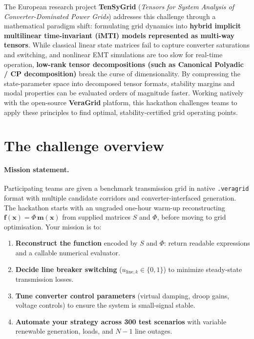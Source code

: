 \documentclass[11pt,a4paper]{article}
\begin{document}
The European research project \textbf{TenSyGrid} (\textit{Tensors for System Analysis of Converter-Dominated Power Grids}) addresses this challenge through a mathematical paradigm shift: formulating grid dynamics into \textbf{hybrid implicit multilinear time-invariant (iMTI) models represented as multi-way tensors}. While classical linear state matrices fail to capture converter saturations and switching, and nonlinear EMT simulations are too slow for real-time operation, \textbf{low-rank tensor decompositions (such as Canonical Polyadic / CP decomposition)} break the curse of dimensionality. By compressing the state-parameter space into decomposed tensor formats, stability margins and modal properties can be evaluated orders of magnitude faster. Working natively with the open-source \textbf{VeraGrid} platform, this hackathon challenges teams to apply these principles to find optimal, stability-certified grid operating points.

\section{The challenge overview}

\paragraph{Mission statement.}
Participating teams are given a benchmark transmission grid in native \texttt{.veragrid} format with multiple candidate corridors and converter-interfaced generation. The hackathon starts with an ungraded one-hour warm-up reconstructing $\mathbf f(\mathbf x)=\Phi\,\mathbf m(\mathbf x)$ from supplied matrices $S$ and $\Phi$, before moving to grid optimisation. Your mission is to:
\begin{enumerate}[leftmargin=*, itemsep=2pt]
  \item \textbf{Reconstruct the function} encoded by $S$ and $\Phi$: return readable expressions and a callable numerical evaluator.
  \item \textbf{Decide line breaker switching} ($u_{\text{line}, k} \in \{0, 1\}$) to minimize steady-state transmission losses.
  \item \textbf{Tune converter control parameters} (virtual damping, droop gains, voltage controls) to ensure the system is small-signal stable.
  \item \textbf{Automate your strategy across 300 test scenarios} with variable renewable generation, loads, and $N-1$ line outages.
\end{enumerate}
\end{document}
